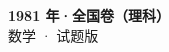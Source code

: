 \documentclass[zihao=-4, a4paper]{ctexart}
\begin{document}
\begin{center}
  {\Large\bfseries 1981 年·全国卷（理科）}\\[4pt]
  {\large 数学 · 试题版}
\end{center}
\medskip
{}

\end{document}

